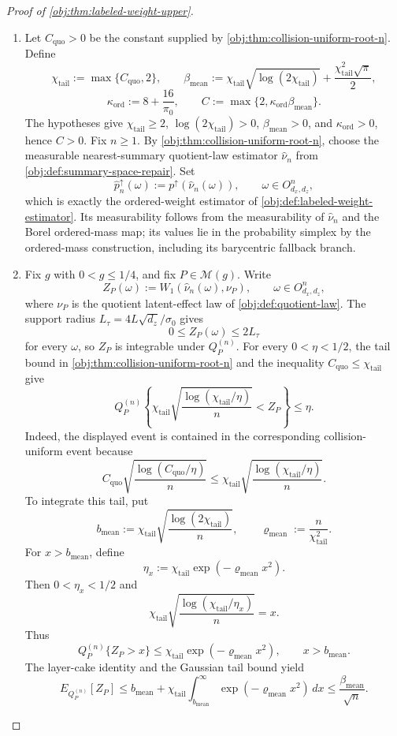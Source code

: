\begin{proof}[Proof of \cref{obj:thm:labeled-weight-upper}]
\begin{enumerate}
\item
Let \(C_{\mathrm{quo}}>0\) be the constant supplied by \cref{obj:thm:collision-uniform-root-n}.  Define
\[
\chi_{\mathrm{tail}}:=\max\{C_{\mathrm{quo}},2\},\qquad
\beta_{\mathrm{mean}}
:=\chi_{\mathrm{tail}}\sqrt{\log(2\chi_{\mathrm{tail}})}
+\frac{\chi_{\mathrm{tail}}^2\sqrt{\pi}}{2},
\]
\[
\kappa_{\mathrm{ord}}:=8+\frac{16}{\pi_0},
\qquad
C:=\max\{2,\kappa_{\mathrm{ord}}\beta_{\mathrm{mean}}\}.
\]
The hypotheses give \(\chi_{\mathrm{tail}}\ge2\), \(\log(2\chi_{\mathrm{tail}})>0\), \(\beta_{\mathrm{mean}}>0\), and \(\kappa_{\mathrm{ord}}>0\), hence \(C>0\).  Fix \(n\ge1\).  By \cref{obj:thm:collision-uniform-root-n}, choose the measurable nearest-summary quotient-law estimator \(\widehat\nu_n\) from \cref{obj:def:summary-space-repair}.  Set
\[
\widehat p_n^{\uparrow}(\omega):=
p^{\uparrow}\!\left(\widehat\nu_n(\omega)\right),
\qquad \omega\in O_{d_x,d_z}^n ,
\]
which is exactly the ordered-weight estimator of \cref{obj:def:labeled-weight-estimator}.  Its measurability follows from the measurability of \(\widehat\nu_n\) and the Borel ordered-mass map; its values lie in the probability simplex by the ordered-mass construction, including its barycentric fallback branch. %

\item
Fix \(g\) with \(0<g\le1/4\), and fix \(P\in\mathcal M(g)\).  Write
\[
Z_P(\omega):=
W_1\!\left(\widehat\nu_n(\omega),\nu_P\right),
\qquad \omega\in O_{d_x,d_z}^n ,
\]
where \(\nu_P\) is the quotient latent-effect law of \cref{obj:def:quotient-law}.  The support radius \(L_\tau=4L\sqrt{d_z}/\sigma_0\) gives
\[
0\le Z_P(\omega)\le 2L_\tau
\]
for every \(\omega\), so \(Z_P\) is integrable under \(Q_P^{(n)}\).  For every \(0<\eta<1/2\), the tail bound in \cref{obj:thm:collision-uniform-root-n} and the inequality \(C_{\mathrm{quo}}\le\chi_{\mathrm{tail}}\) give
\[
Q_P^{(n)}\!\left\{
\chi_{\mathrm{tail}}\sqrt{\frac{\log(\chi_{\mathrm{tail}}/\eta)}{n}}
< Z_P
\right\}
\le \eta .
\]
Indeed, the displayed event is contained in the corresponding collision-uniform event because
\[
C_{\mathrm{quo}}\sqrt{\frac{\log(C_{\mathrm{quo}}/\eta)}{n}}
\le
\chi_{\mathrm{tail}}\sqrt{\frac{\log(\chi_{\mathrm{tail}}/\eta)}{n}} .
\]
To integrate this tail, put
\[
b_{\mathrm{mean}}:=
\chi_{\mathrm{tail}}\sqrt{\frac{\log(2\chi_{\mathrm{tail}})}{n}},
\qquad
\varrho_{\mathrm{mean}}:=\frac{n}{\chi_{\mathrm{tail}}^2}.
\]
For \(x>b_{\mathrm{mean}}\), define
\[
\eta_x:=\chi_{\mathrm{tail}}\exp(-\varrho_{\mathrm{mean}}x^2).
\]
Then \(0<\eta_x<1/2\) and
\[
\chi_{\mathrm{tail}}\sqrt{\frac{\log(\chi_{\mathrm{tail}}/\eta_x)}{n}}=x.
\]
Thus
\[
Q_P^{(n)}\{Z_P>x\}\le
\chi_{\mathrm{tail}}\exp(-\varrho_{\mathrm{mean}}x^2),
\qquad x>b_{\mathrm{mean}}.
\]
The layer-cake identity and the Gaussian tail bound yield
\[
E_{Q_P^{(n)}}[Z_P]
\le
b_{\mathrm{mean}}
+\chi_{\mathrm{tail}}\int_{b_{\mathrm{mean}}}^{\infty}
\exp(-\varrho_{\mathrm{mean}}x^2)\,dx
\le
\frac{\beta_{\mathrm{mean}}}{\sqrt n}.
\] %


\end{enumerate}
\end{proof}
